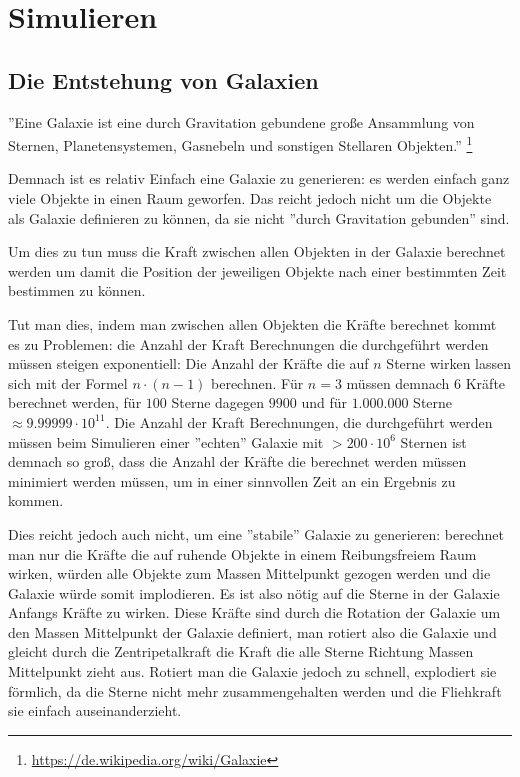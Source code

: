 \section{Simulieren}

\subsection{Die Entstehung von Galaxien}
\par ''Eine Galaxie ist eine durch Gravitation gebundene große Ansammlung von
Sternen, Planetensystemen, Gasnebeln und sonstigen Stellaren Objekten.''
\footnote{\url{https://de.wikipedia.org/wiki/Galaxie}}

\par Demnach ist es relativ Einfach eine Galaxie zu generieren: es werden
einfach ganz viele Objekte in einen Raum geworfen. Das reicht jedoch nicht um
die Objekte als Galaxie definieren zu können, da sie nicht ''durch Gravitation
gebunden'' sind.

\par Um dies zu tun muss die Kraft zwischen allen Objekten in der Galaxie
berechnet werden um damit die Position der jeweiligen Objekte nach einer
bestimmten Zeit bestimmen zu können.

\par Tut man dies, indem man zwischen allen Objekten die Kräfte berechnet kommt
es zu Problemen: die Anzahl der Kraft Berechnungen die durchgeführt werden
müssen steigen exponentiell: Die Anzahl der Kräfte die auf \(n\) Sterne wirken
lassen sich mit der Formel \( n \cdot (n-1) \) berechnen. Für \( n=3 \) müssen
demnach \( 6 \) Kräfte berechnet werden, für \( 100 \) Sterne dagegen \( 9900
\) und für \( 1.000.000 \) Sterne \( \approx 9.99999 \cdot 10^{11} \). Die
Anzahl der Kraft Berechnungen, die durchgeführt werden müssen beim Simulieren
einer ''echten'' Galaxie mit \( > 200 \cdot 10^6 \) Sternen ist demnach so
groß, dass die Anzahl der Kräfte die berechnet werden müssen minimiert werden
müssen, um in einer sinnvollen Zeit an ein Ergebnis zu kommen.

\par Dies reicht jedoch auch nicht, um eine ''stabile'' Galaxie zu generieren:
berechnet man nur die Kräfte die auf ruhende Objekte in einem Reibungsfreiem
Raum wirken, würden alle Objekte zum Massen Mittelpunkt gezogen werden und die
Galaxie würde somit implodieren. Es ist also nötig auf die Sterne in der
Galaxie Anfangs Kräfte zu wirken. Diese Kräfte sind durch die Rotation der
Galaxie um den Massen Mittelpunkt der Galaxie definiert, man rotiert also die
Galaxie und gleicht durch die Zentripetalkraft die Kraft die alle Sterne
Richtung Massen Mittelpunkt zieht aus. Rotiert man die Galaxie jedoch zu
schnell, explodiert sie förmlich, da die Sterne nicht mehr zusammengehalten
werden und die Fliehkraft sie einfach auseinanderzieht.

